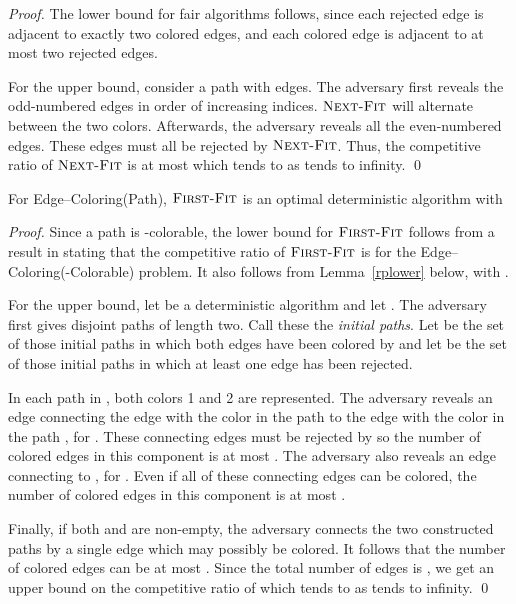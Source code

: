 \documentclass[smallextended]{svjour3}
\def\mcpath{{\sc Edge--Coloring(Path)}\xspace}
\def\mckcol{{\sc Edge--Coloring(-Colorable)}\xspace}
\newcommand{\NF}{\ensuremath{\operatorname{\textsc{Next-Fit}}}\xspace}
\newcommand{\FF}{\ensuremath{\operatorname{\textsc{First-Fit}}}\xspace}
\begin{document}
\begin{proof}
The lower bound for fair algorithms follows, since 
 each rejected edge is adjacent to exactly two colored edges, and each
 colored edge is adjacent to at most two rejected edges.

For the upper bound, consider a path  with  edges.
The adversary first reveals the odd-numbered edges
 in order of increasing indices.
\NF will alternate between the two colors. 
Afterwards, the adversary reveals all the even-numbered edges. These edges must all be rejected by \NF. Thus, the competitive ratio of \NF is at most  which tends to  as  tends to infinity.
\qed
\end{proof}

\begin{proposition}
\label{FFpathlower}
For \mcpath, \FF is an optimal deterministic algorithm with
 
\end{proposition}

\begin{proof}
Since a path is -colorable, the lower bound for \FF follows from a
 result in \cite{kedge} stating that the competitive ratio of \FF is
  for the \mckcol problem.
It also follows from Lemma~\ref{rplower} below, with .

For the upper bound, let  be a deterministic algorithm and let . The adversary first gives  disjoint paths of length two. Call these the \emph{initial paths}. Let  be the set of those initial paths in which both edges have been colored by  and let  be the set of those initial paths in which at least one edge has been rejected. 

In each path in , both colors 1 and 2 are represented.
The adversary reveals an edge connecting the edge with the color  in the path  to the edge with the color  in the path , for . These connecting edges must be rejected by  so the number of colored edges in this component is at most . The adversary also reveals an edge connecting  to , for . Even if all of these connecting edges can be colored, the number of colored edges in this component is at most . 

Finally, if both  and  are non-empty, the adversary connects the two constructed paths by a single edge which may possibly be colored. It follows that the number of colored edges can be at most . Since the total number of edges is , we get an upper bound on the competitive ratio of  which tends to  as  tends to infinity.
\qed\end{proof}
\end{document}
